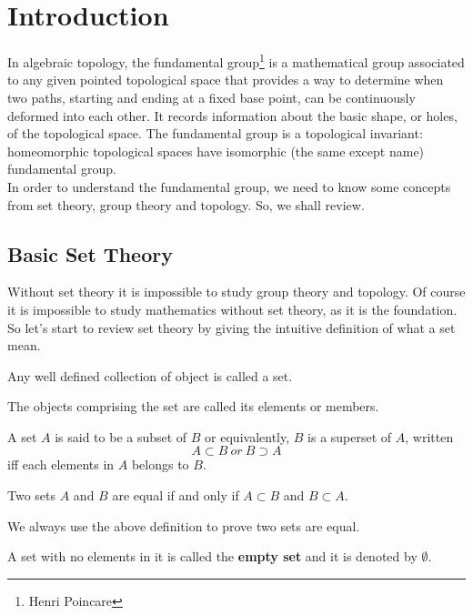 \chapter{Introduction}

In algebraic topology, the fundamental group\footnote{Henri Poincare} is a mathematical group associated to any given pointed topological space that provides a way to determine when two paths, starting and ending at a fixed base point, can be continuously deformed into each other. It records information about the basic shape, or holes, of the topological space. The fundamental group is a topological invariant: homeomorphic topological spaces have isomorphic (the same except name) fundamental group.\\
In order to understand the fundamental group, we need to know some concepts from set theory, group theory and topology. So, we shall review.
\section{Basic Set Theory}
Without set theory it is impossible to study group theory and topology. Of course it is impossible to study mathematics without set theory, as it is the foundation. So let's start to review set theory by giving the intuitive definition of what a set mean.
\begin{definition}
Any well defined collection of object is called a set.
\end{definition}
The objects comprising the set are called its elements or members.
\begin{definition}
A set $A$ is said to be a subset of $B$ or equivalently, $B$ is a superset of $A$, written
$$ A\subset B ~or~ B\supset A$$
iff each elements in $A$ belongs to $B$.
\end{definition}

\begin{definition}
Two sets $A$ and $B$ are equal if and only if  $A\subset B$ and $B\subset A$.
\end{definition}
We always use the above definition to prove two sets are equal.
\begin{definition}
A set with no elements in it is called the \textbf{empty set} and  it is denoted by $\emptyset$.
\end{definition}

